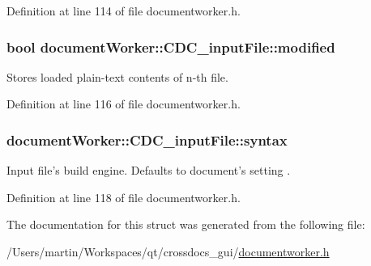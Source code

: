 Definition at line 114 of file documentworker.\+h.

\hypertarget{structdocument_worker_1_1_c_d_c__input_file_a1d8506dc892dc3214443fd12e4c00a95}{
\subsubsection[{modified}]{\setlength{\rightskip}{0pt plus 5cm}bool document\+Worker\+::\+C\+D\+C\+\_\+input\+File\+::modified}}\label{structdocument_worker_1_1_c_d_c__input_file_a1d8506dc892dc3214443fd12e4c00a95}


Stores loaded plain-\/text contents of n-\/th file. 



Definition at line 116 of file documentworker.\+h.

\hypertarget{structdocument_worker_1_1_c_d_c__input_file_a7d61569171fa87894c81e9b85575d1be}{
\subsubsection[{syntax}]{ document\+Worker\+::\+C\+D\+C\+\_\+input\+File\+::syntax}}\label{structdocument_worker_1_1_c_d_c__input_file_a7d61569171fa87894c81e9b85575d1be}


Input file's build engine. Defaults to document's setting . 



Definition at line 118 of file documentworker.\+h.



The documentation for this struct was generated from the following file\+:\begin{DoxyCompactItemize}
\item 
/\+Users/martin/\+Workspaces/qt/crossdocs\+\_\+gui/\hyperlink{documentworker_8h}{documentworker.\+h}\end{DoxyCompactItemize}
